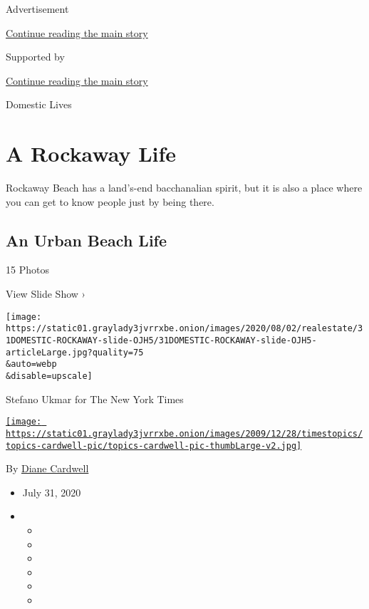 Advertisement

\protect\hyperlink{after-top}{Continue reading the main story}

Supported by

\protect\hyperlink{after-sponsor}{Continue reading the main story}

Domestic Lives

\hypertarget{a-rockaway-life}{%
\section{A Rockaway Life}\label{a-rockaway-life}}

Rockaway Beach has a land's-end bacchanalian spirit, but it is also a
place where you can get to know people just by being there.

\href{https://www.nytimes3xbfgragh.onion/slideshow/2020/07/31/realestate/an-urban-beach-life.html}{}

\hypertarget{an-urban-beach-life}{%
\subsection{An Urban Beach Life}\label{an-urban-beach-life}}

15 Photos

View Slide Show ›

\texttt{[image: https://static01.graylady3jvrrxbe.onion/images/2020/08/02/realestate/31DOMESTIC-ROCKAWAY-slide-OJH5/31DOMESTIC-ROCKAWAY-slide-OJH5-articleLarge.jpg?quality=75\\\&auto=webp\\\&disable=upscale]}

Stefano Ukmar for The New York Times

\href{https://www.nytimes3xbfgragh.onion/by/diane-cardwell}{\texttt{[image: https://static01.graylady3jvrrxbe.onion/images/2009/12/28/timestopics/topics-cardwell-pic/topics-cardwell-pic-thumbLarge-v2.jpg]}}

By \href{https://www.nytimes3xbfgragh.onion/by/diane-cardwell}{Diane
Cardwell}

\begin{itemize}
\item
  July 31, 2020
\item
  \begin{itemize}
  \item
  \item
  \item
  \item
  \item
  \item
  \end{itemize}
\end{itemize}

